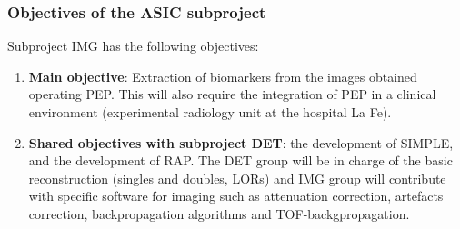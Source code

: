 \subsubsection*{Objectives of the ASIC subproject}
Subproject IMG has the following objectives:
\begin{enumerate}
\item {\bf Main objective}: Extraction of biomarkers from the images obtained operating PEP. This will also require the integration of PEP in a clinical environment (experimental radiology unit at the hospital La Fe). 
\item {\bf Shared objectives with subproject DET}: the development of SIMPLE, and the development of RAP. The DET group will be in charge of the basic reconstruction (singles and doubles, LORs) and IMG group will contribute with specific software for imaging such as attenuation correction, artefacts correction, backpropagation algorithms and TOF-backgpropagation.
\end{enumerate}
